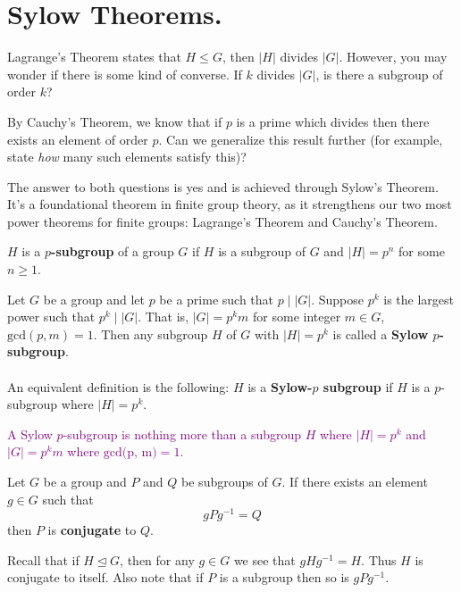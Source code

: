 \documentclass[12pt,letterpaper]{algebra_book}
\newcommand{\normal}{\unlhd}
\theoremstyle{definition}
\begin{document}
    \newpage
    \section{Sylow Theorems.}
    Lagrange's Theorem states that $H \le G$, then $|H|$ divides
    $|G|$. However, you may wonder if there is some kind of converse.
    If $k$ divides $|G|$, is there a subgroup of order $k$? 

    By Cauchy's Theorem, we know that if $p$ is a prime which divides
    then there exists an element of order $p$. Can we generalize this
    result further (for example, state \textit{how} many such elements
    satisfy this)? 

    The answer to both questions is yes and is achieved through
    Sylow's Theorem. It's a foundational theorem in finite group
    theory, as it
    strengthens our two most power theorems for finite groups:
    Lagrange's Theorem and Cauchy's Theorem.

    \begin{definition}
        $H$ is a \textbf{$p$-subgroup} of a group $G$ if $H$ is a
        subgroup of $G$ and $|H| = p^n$ for some $n \ge 1$.
    \end{definition}

    \begin{definition}
        Let $G$ be a group and let $p$ be a prime such that $p\mid
        |G|$. Suppose $p^k$ is the largest power such that $p^k \mid
        |G|$. That is, $|G| = p^km$ for some integer $m \in G$,
        $\mbox{gcd}(p, m) = 1$. Then any subgroup $H$ of $G$ with $|H| = p^k$ is called a
        \textbf{Sylow $p$-subgroup}.
        \\
        \\
        An equivalent definition is the following: $H$ is a 
        \textbf{Sylow-$p$ subgroup} if $H$ is a $p$-subgroup where
        $|H| = p^k$.
    \end{definition}

    \textcolor{purple}{A Sylow $p$-subgroup is nothing more than a subgroup $H$ where
    $|H| = p^k$ and $|G| = p^km$ where $\mbox{gcd(p, m)} = 1$.}

    \begin{definition}
        Let $G$ be a group and $P$ and $Q$ be subgroups of $G$. If
        there exists an element $g \in G$ such that 
        \[
            gPg^{-1} = Q
        \]
        then $P$ is \textbf{conjugate} to $Q$.
    \end{definition}
    Recall that if $H \normal G$, then for any $g \in G$ we see that
    $gHg^{-1} = H$. Thus $H$ is conjugate to itself.
    Also note that if $P$ is a subgroup then so is $gPg^{-1}$.
\end{document}
